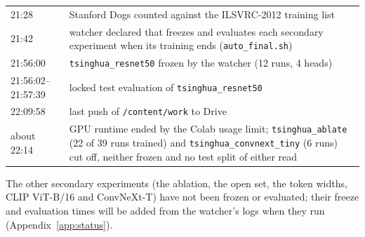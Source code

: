\documentclass[11pt,a4paper]{article}
\theoremstyle{plain}
\begin{document}
\begin{table}[!htbp]
\begin{tabularx}{\textwidth}{@{}lY@{}}
21:28 & Stanford Dogs counted against the ILSVRC-2012 training list\\
21:42 & watcher declared that freezes and evaluates each secondary experiment when its training ends
(\texttt{auto\_final.sh})\\
21:56:00 & \texttt{tsinghua\_resnet50} frozen by the watcher (12 runs, 4 heads)\\
21:56:02--21:57:39 & locked test evaluation of \texttt{tsinghua\_resnet50}\\
22:09:58 & last push of \texttt{/content/work} to Drive\\
about 22:14 & GPU runtime ended by the Colab usage limit; \texttt{tsinghua\_ablate} (22 of 39 runs trained) and
\texttt{tsinghua\_convnext\_tiny} (6 runs) cut off, neither frozen and no test split of either read\\
\bottomrule
\end{tabularx}
\end{table}
The other secondary experiments (the ablation, the open set, the token widths, CLIP ViT-B/16 and ConvNeXt-T) have
not been frozen or evaluated; their freeze and evaluation times will be added from the watcher's logs when they
run (Appendix~\ref{app:status}).
\end{document}
